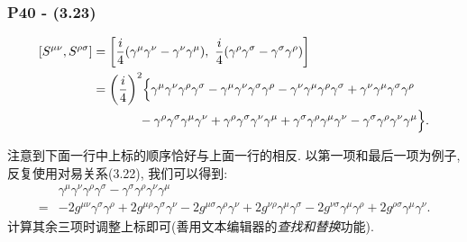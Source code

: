 \documentclass[cn,hazy,blue,11pt,device=normal,chinesefont=founder]{elegantnote}
\begin{document}
\subsubsection{P40 - (3.23)}

\begin{equation}
  \begin{aligned}
    \relax
    [S^{\mu\nu}, S^{\rho\sigma}] &= \biggl[\frac{i}{4}(\gamma^\mu \gamma^\nu - \gamma^\nu \gamma^\mu), \ \frac{i}{4}(\gamma^\rho \gamma^\sigma - \gamma^\sigma \gamma^\rho)\biggr]\\
    &= \biggl(\frac{i}{4}\biggr)^2 \Bigl\{\gamma^\mu \gamma^\nu \gamma^\rho \gamma^\sigma - \gamma^\mu \gamma^\nu \gamma^\sigma \gamma^\rho - \gamma^\nu \gamma^\mu \gamma^\rho \gamma^\sigma + \gamma^\nu \gamma^\mu \gamma^\sigma \gamma^\rho \\ 
    &\qquad \quad \ \ - \gamma^\rho \gamma^\sigma \gamma^\mu \gamma^\nu + \gamma^\rho \gamma^\sigma \gamma^\nu \gamma^\mu + \gamma^\sigma \gamma^\rho \gamma^\mu \gamma^\nu - \gamma^\sigma \gamma^\rho \gamma^\nu \gamma^\mu \Bigr\}. 
  \end{aligned}
\end{equation}

注意到下面一行中上标的顺序恰好与上面一行的相反. 以第一项和最后一项为例子, 反复使用对易关系(3.22), 我们可以得到: 
\begin{equation}
  \begin{aligned}
    &\gamma^\mu \gamma^\nu \gamma^\rho \gamma^\sigma - \gamma^\sigma \gamma^\rho \gamma^\nu \gamma^\mu \\
    = &- 2g^{\mu\nu}\gamma^\sigma \gamma^\rho + 2g^{\mu\rho}\gamma^\sigma \gamma^\nu - 2g^{\mu\sigma}\gamma^\rho \gamma^\nu + 2g^{\nu\rho}\gamma^\mu \gamma^\sigma - 2g^{\nu\sigma}\gamma^\mu \gamma^\rho + 2g^{\rho\sigma}\gamma^\mu \gamma^\nu. 
  \end{aligned}
\end{equation}
计算其余三项时调整上标即可(善用文本编辑器的\textit{查找和替换}功能). 
\end{document}
